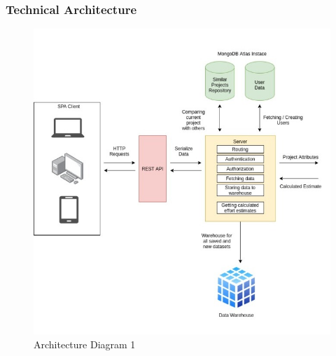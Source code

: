 \subsubsection{Technical Architecture}
\begin{figure}[H]
    \centering
    \includegraphics[scale=0.4]{./diagrams/architecture-diagram-1.jpeg}
    \caption{Architecture Diagram 1}
    \label{fig:arch-diag-1}

\end{figure}

